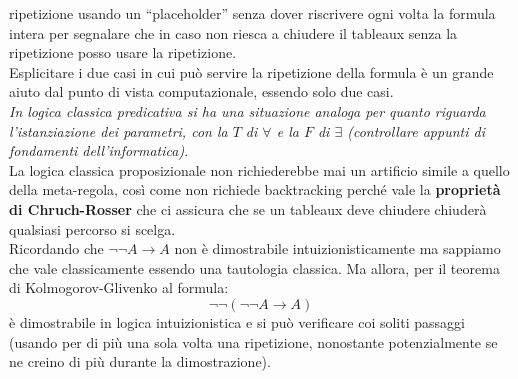 \documentclass[a4paper,12pt, oneside]{book}
\begin{document}
ripetizione usando un ``placeholder'' senza dover riscrivere ogni volta la
formula intera  per segnalare che in caso non riesca a
chiudere il tableaux senza la ripetizione posso usare la ripetizione.\\ 
Esplicitare i due casi in cui può servire la ripetizione della formula è un
grande aiuto dal punto di vista computazionale, essendo solo due casi.\\
\textit{In logica classica predicativa si ha una situazione analoga per quanto
  riguarda l'istanziazione dei parametri, con la $T$ di $\forall$ e la $F$ di
  $\exists$ (controllare appunti di fondamenti dell'informatica)}.\\
La logica classica proposizionale non richiederebbe mai un artificio simile a
quello della meta-regola, così come non richiede backtracking perché vale la
\textbf{proprietà di Chruch-Rosser} che ci assicura che se un tableaux deve
chiudere chiuderà qualsiasi percorso si scelga.\\
Ricordando che $\neg\neg A\to A$ non è dimostrabile intuizionisticamente ma
sappiamo che vale classicamente essendo una tautologia classica. Ma allora, per
il teorema di Kolmogorov-Glivenko al formula:
\[\neg\neg(\neg\neg A\to A)\]
è dimostrabile in logica intuizionistica e si può verificare coi soliti
passaggi (usando per di più una sola volta una ripetizione, nonostante
potenzialmente se ne creino di più durante la dimostrazione).
\end{document}
